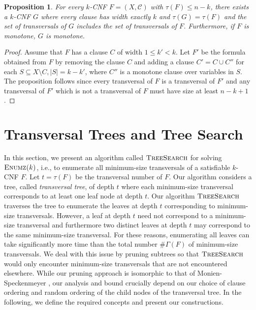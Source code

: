 \documentclass[10pt,a4paper]{article}
\newtheorem{proposition}{Proposition}
\newcommand{\cC}{\mathcal{C}}
\newcommand{\trn}{\tau}
\newcommand{\ntrn}{\#\Gamma}
\newcommand\enumz[1]{\textsc{Enumz($#1$)}}
\newcommand{\ts}{\textsc{TreeSearch}}
\begin{document}
\begin{proposition}
\label{prop:monotone-k-cnf-uniform}
For every $k$-CNF $F = (X, \cC)$ with $\trn(F) \le n-k$,
there exists a $k$-CNF $G$ where every clause has width exactly $k$
and $\trn(G) = \trn(F)$
and the set of transversals of $G$ includes the
set of transversals of $F$.
Furthermore, if $F$ is monotone, $G$ is monotone.
\end{proposition}

\begin{proof}
Assume that $F$ has a clause $C$ of width $1\leq k'<k$.
Let $F'$ be the formula obtained from $F$ by removing the clause $C$
and adding a clause  $C' = C\cup C'' $ for
each $S\subseteq X\setminus C, |S|= k-k'$, where $C''$ is a monotone clause over variables in $S$.
The proposition follows since every transversal of
$F$ is a transversal of $F'$ and any transversal
of $F'$ which is not a transversal of $F$ must have size at least $n-k+1$.
\end{proof}

\section{Transversal Trees  and Tree Search} \label{sec:transversal-tree}

In this section, we present an algorithm called $\ts$ 
for solving $\enumz{k}$, i.e., 
to enumerate all minimum-size transversals 
of a satisfiable $k$-CNF $F$. Let  $t=\trn(F)$ be the transversal number of $F$.
Our algorithm considers a tree,
called \emph{transversal tree}, of depth $t$
where each minimum-size transversal corresponds to at least
one leaf node at depth $t$.
Our algorithm $\ts$ traverses the tree to enumerate 
the leaves at depth $t$ corresponding to 
minimum-size transversals. 
However, 
a leaf at depth $t$ 
need not correspond to a minimum-size transversal and 
furthermore two distinct leaves at depth $t$ may 
correspond to the same
minimum-size transversal.
For these reasons, 
enumerating all leaves can take significantly more
time than the total number $\ntrn(F)$
of minimum-size transversals.
We
deal with this issue by pruning subtrees so that 
$\ts$ would only encounter 
minimum-size transversals 
that are not encountered elsewhere.
While our pruning approach is isomorphic to that of Monien-Speckenmeyer \cite{MonienS85}, 
our analysis and bound crucially depend on 
our choice of clause ordering 
and random ordering of the child nodes of the transversal tree.
In the following, we define the required concepts and present 
our constructions.
\end{document}

